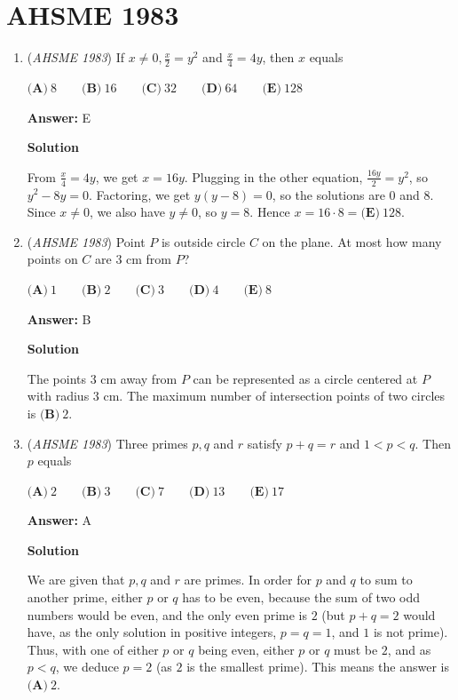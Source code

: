 \section{AHSME 1983}
        \begin{enumerate}
        	\item (\textit{AHSME 1983}) If $x \neq 0, \frac x{2} = y^2$ and $\frac{x}{4} = 4y$, then $x$ equals


 $\textbf{(A)}\ 8\qquad \textbf{(B)}\ 16\qquad \textbf{(C)}\ 32\qquad \textbf{(D)}\ 64\qquad \textbf{(E)}\ 128$

 \textbf{Answer: }E



\textbf{Solution}

From $\frac{x}{4} = 4y$, we get $x=16y$. Plugging in the other equation, $\frac{16y}{2} = y^2$, so $y^2-8y=0$. Factoring, we get $y(y-8)=0$, so the solutions are $0$ and $8$. Since $x \neq 0$, we also have $y \neq 0$, so $y=8$. Hence $x=16\cdot 8 = \boxed{\textbf{(E)}\ 128}$.

 


	\item (\textit{AHSME 1983}) Point $P$ is outside circle $C$ on the plane. At most how many points on $C$ are $3$ cm from $P$? 


 $\textbf{(A)} \ 1 \qquad  \textbf{(B)} \ 2 \qquad  \textbf{(C)} \ 3 \qquad  \textbf{(D)} \ 4 \qquad  \textbf{(E)} \ 8$

 \textbf{Answer: }B



\textbf{Solution}

The points $3$ cm away from $P$ can be represented as a circle centered at $P$ with radius $3$ cm. The maximum number of intersection points of two circles is $\boxed{\textbf{(B)} \ 2}$.

 


	\item (\textit{AHSME 1983}) Three primes $p,q$ and $r$ satisfy $p+q = r$ and $1 < p < q$. Then $p$ equals


 $\textbf{(A)}\ 2\qquad \textbf{(B)}\ 3\qquad \textbf{(C)}\ 7\qquad \textbf{(D)}\ 13\qquad \textbf{(E)}\ 17$

 \textbf{Answer: }A



\textbf{Solution}

We are given that $p,q$ and $r$ are primes. In order for $p$ and $q$ to sum to another prime, either $p$ or $q$ has to be even, because the sum of two odd numbers would be even, and the only even prime is $2$ (but $p + q = 2$ would have, as the only solution in positive integers, $p = q = 1$, and $1$ is not prime). Thus, with one of either $p$ or $q$ being even, either $p$ or $q$ must be $2$, and as $p < q$, we deduce $p = 2$ (as $2$ is the smallest prime). This means the answer is $\boxed{\textbf{(A)}\ 2}$.


\end{enumerate}
